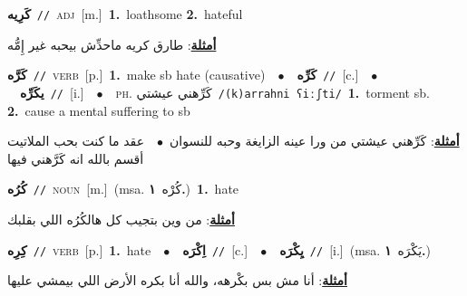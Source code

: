 \documentclass[10pt,a4paper,twoside]{article} %
\begin{document}
\begin{multicols}{2}
{\setlength\topsep{0pt}\textbf{\foreignlanguage{arabic}{كَرِيه}}\ {\color{gray}\texttt{//}\color{black}}\ \textsc{adj}\ [m.]\ \textbf{1.}~loathsome  \textbf{2.}~hateful\  \begin{flushright}\color{gray}\foreignlanguage{arabic}{\textbf{\underline{\foreignlanguage{arabic}{أمثلة}}}: طارق كريه ماحدِّش بيحبه غير إِمُّه}\end{flushright}\color{black}} \vspace{2mm}

{\setlength\topsep{0pt}\textbf{\foreignlanguage{arabic}{كَرَّه}}\ {\color{gray}\texttt{//}\color{black}}\ \textsc{verb}\ [p.]\ \textbf{1.}~make sb hate (causative)\ \ $\bullet$\ \ \setlength\topsep{0pt}\textbf{\foreignlanguage{arabic}{كَرِّه}}\ {\color{gray}\texttt{//}\color{black}}\ [c.]\ \ $\bullet$\ \ \setlength\topsep{0pt}\textbf{\foreignlanguage{arabic}{يكَرِّه}}\ {\color{gray}\texttt{//}\color{black}}\ [i.]\ \ $\bullet$\ \ \textsc{ph.} \color{gray} \foreignlanguage{arabic}{كَرِّهني عيشتي}\color{black}\ {\color{gray}\texttt{/{\sffamily (k)arrahni ʕiːʃti}/}\color{black}}\ \textbf{1.}~torment sb.  \textbf{2.}~cause a mental suffering to sb\  \begin{flushright}\color{gray}\foreignlanguage{arabic}{\textbf{\underline{\foreignlanguage{arabic}{أمثلة}}}: كَرِّهني عيشتي من ورا عينه الزايغة وحبه للنسوان\ $\bullet$\ \  عقد ما كنت بحب الملاتيت أقسم بالله انه كَرَّهني فيها}\end{flushright}\color{black}} \vspace{2mm}

{\setlength\topsep{0pt}\textbf{\foreignlanguage{arabic}{كُرُه}}\ {\color{gray}\texttt{//}\color{black}}\ \textsc{noun}\ [m.]\ \color{gray}(msa. \foreignlanguage{arabic}{كُرْه}~\foreignlanguage{arabic}{\textbf{١.}})\color{black}\ \textbf{1.}~hate\  \begin{flushright}\color{gray}\foreignlanguage{arabic}{\textbf{\underline{\foreignlanguage{arabic}{أمثلة}}}: من وين بتجيب كل هالكُرُه اللي بقلبك}\end{flushright}\color{black}} \vspace{2mm}

{\setlength\topsep{0pt}\textbf{\foreignlanguage{arabic}{كِرِه}}\ {\color{gray}\texttt{//}\color{black}}\ \textsc{verb}\ [p.]\ \textbf{1.}~hate\ \ $\bullet$\ \ \setlength\topsep{0pt}\textbf{\foreignlanguage{arabic}{اِكْرَه}}\ {\color{gray}\texttt{//}\color{black}}\ [c.]\ \ $\bullet$\ \ \setlength\topsep{0pt}\textbf{\foreignlanguage{arabic}{يِكْرَه}}\ {\color{gray}\texttt{//}\color{black}}\ [i.]\ \color{gray}(msa. \foreignlanguage{arabic}{يَكْرَه}~\foreignlanguage{arabic}{\textbf{١.}})\color{black}\  \begin{flushright}\color{gray}\foreignlanguage{arabic}{\textbf{\underline{\foreignlanguage{arabic}{أمثلة}}}: أنا مش بس بكْرهه، والله أنا بكره الأرض اللي بيمشي عليها}\end{flushright}\color{black}} \vspace{2mm}


\end{multicols}
\end{document}
